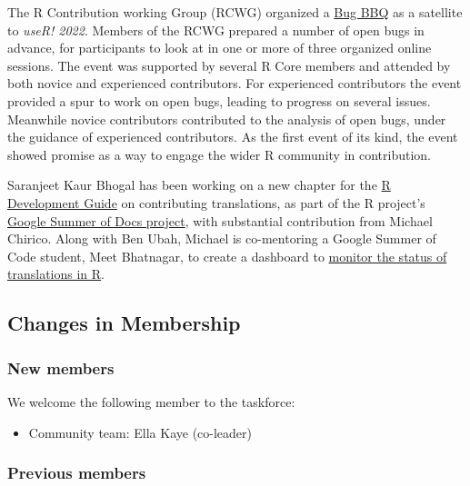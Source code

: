 The R Contribution working Group (RCWG) organized a
\href{https://contributor.r-project.org/events/bug-bbq}{Bug BBQ} as a
satellite to \emph{useR! 2022}. Members of the RCWG prepared a number of
open bugs in advance, for participants to look at in one or more of
three organized online sessions. The event was supported by several R
Core members and attended by both novice and experienced contributors.
For experienced contributors the event provided a spur to work on open
bugs, leading to progress on several issues. Meanwhile novice
contributors contributed to the analysis of open bugs, under the
guidance of experienced contributors. As the first event of its kind,
the event showed promise as a way to engage the wider R community in
contribution.

Saranjeet Kaur Bhogal has been working on a new chapter for the
\href{https://contributor.r-project.org/rdevguide/}{R Development Guide}
on contributing translations, as part of the R project's
\href{https://github.com/rstats-gsod/gsod2022/wiki/GSOD-2022-Proposal}{Google
Summer of Docs project}, with substantial contribution from Michael
Chirico. Along with Ben Ubah, Michael is co-mentoring a Google Summer of
Code student, Meet Bhatnagar, to create a dashboard to
\href{https://github.com/rstats-gsoc/gsoc2022/wiki/Track-R-Translations-Status}{monitor
the status of translations in R}.

\hypertarget{changes-in-membership}{%
\subsection{Changes in Membership}\label{changes-in-membership}}

\hypertarget{new-members}{%
\subsubsection{New members}\label{new-members}}

We welcome the following member to the taskforce:

\begin{itemize}
\tightlist
\item
  Community team: Ella Kaye (co-leader)
\end{itemize}

\hypertarget{previous-members}{%
\subsubsection{Previous members}\label{previous-members}}


